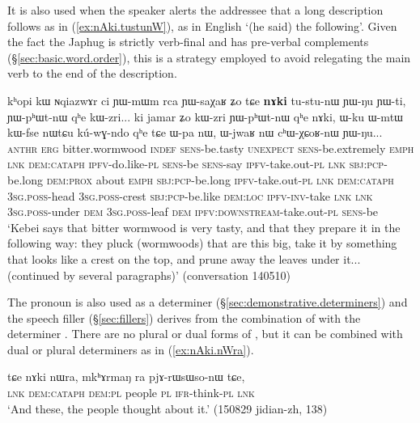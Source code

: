 It is also used  when the speaker alerts the addressee that a long description follows as in (\ref{ex:nAki.tustunW}), as in English `(he said) the following'. Given the fact the Japhug is strictly verb-final and has pre-verbal complements (§\ref{sec:basic.word.order}), this is a strategy employed to avoid relegating the main verb to the end of the description.

 \begin{exe}
\ex \label{ex:nAki.tustunW}
 \gll kʰopi kɯ ɴqiazwɤr ci ɲɯ-mɯm rca ɲɯ-saχaʁ ʑo tɕe \textbf{nɤki} tu-stu-nɯ ɲɯ-ŋu ɲɯ-ti, ɲɯ-pʰɯt-nɯ qʰe kɯ-zri... ki jamar ʑo kɯ-zri ɲɯ-pʰɯt-nɯ qʰe nɤki, ɯ-ku ɯ-mtɯ kɯ-fse nɯtɕu kú-wɣ-ndo qʰe tɕe ɯ-pa nɯ, ɯ-jwaʁ nɯ cʰɯ-χɕoʁ-nɯ ɲɯ-ŋu...  \\
\textsc{anthr} \textsc{erg} bitter.wormwood \textsc{indef} \textsc{sens}-be.tasty \textsc{unexpect} \textsc{sens}-be.extremely \textsc{emph} \textsc{lnk} \textsc{dem}:\textsc{cataph} \textsc{ipfv}-do.like-\textsc{pl} \textsc{sens}-be \textsc{sens}-say \textsc{ipfv}-take.out-\textsc{pl} \textsc{lnk} \textsc{sbj}:\textsc{pcp}-be.long \textsc{dem}:\textsc{prox} about \textsc{emph} \textsc{sbj}:\textsc{pcp}-be.long \textsc{ipfv}-take.out-\textsc{pl} \textsc{lnk} \textsc{dem}:\textsc{cataph} \textsc{3sg}.\textsc{poss}-head  \textsc{3sg}.\textsc{poss}-crest \textsc{sbj}:\textsc{pcp}-be.like  \textsc{dem}:\textsc{loc} \textsc{ipfv}-\textsc{inv}-take \textsc{lnk} \textsc{lnk} \textsc{3sg}.\textsc{poss}-under \textsc{dem}  \textsc{3sg}.\textsc{poss}-leaf \textsc{dem} \textsc{ipfv}:\textsc{downstream}-take.out-\textsc{pl}  \textsc{sens}-be \\
\glt `Kebei says that bitter wormwood is very tasty, and that they prepare it in the following way: they pluck (wormwoods) that are this big, take it by something that looks like a crest on the top, and prune away the leaves under it... (continued by several paragraphs)' (conversation 140510)
\end{exe}

The pronoun  is also used as a determiner (§\ref{sec:demonstrative.determiners}) and the speech filler  (§\ref{sec:fillers}) derives from the combination of    with the determiner . There are no plural or dual forms of , but it can be combined with dual or plural determiners as in (\ref{ex:nAki.nWra}).

\begin{exe}
\ex \label{ex:nAki.nWra}
\gll  tɕe nɤki nɯra, mkʰɤrmaŋ ra pjɤ-rɯsɯso-nɯ tɕe, \\
\textsc{lnk} \textsc{dem}:\textsc{cataph} \textsc{dem}:\textsc{pl} people \textsc{pl} \textsc{ifr}-think-\textsc{pl} \textsc{lnk} \\
\glt `And these, the people thought about it.' (150829 jidian-zh, 138)
\end{exe}

